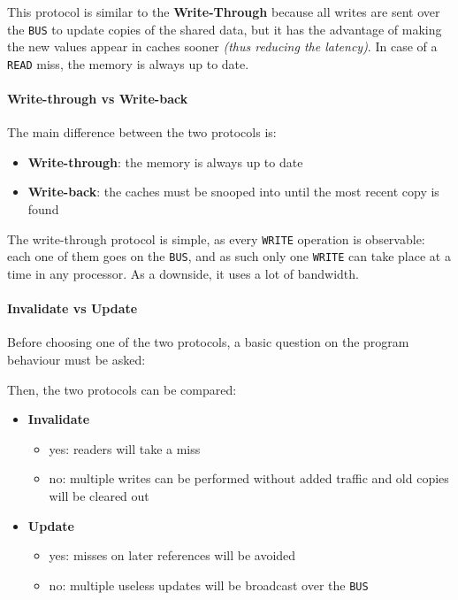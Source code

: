 \documentclass[english]{article}
\begin{document}
This protocol is similar to the \textbf{Write-Through} because all writes are sent over the \texttt{BUS} to update copies of the shared data, but it has the advantage of making the new values appear in caches sooner \textit{(thus reducing the latency)}.
In case of a \texttt{READ} miss, the memory is always up to date.

\paragraph{Write-through vs Write-back}

The main difference between the two protocols is:

\begin{itemize}
  \item \textbf{Write-through}: the memory is always up to date
  \item \textbf{Write-back}: the caches must be snooped into until the most recent copy is found
\end{itemize}

The write-through protocol is simple, as every \texttt{WRITE} operation is observable:
each one of them goes on the \texttt{BUS}, and as such only one \texttt{WRITE} can take place at a time in any processor.
As a downside, it uses a lot of bandwidth.

\paragraph{Invalidate vs Update}

Before choosing one of the two protocols, a basic question on the program behaviour must be asked:


Then, the two protocols can be compared:

\begin{itemize}
  \item \textbf{Invalidate}
        \begin{itemize}
          \item[\cmark] yes: readers will take a miss
          \item[\xmark] no: multiple writes can be performed without added traffic and old copies will be cleared out
        \end{itemize}
  \item \textbf{Update}
        \begin{itemize}
          \item[\cmark] yes: misses on later references will be avoided
          \item[\xmark] no: multiple useless updates will be broadcast over the \texttt{BUS}
        \end{itemize}
\end{itemize}
\end{document}
